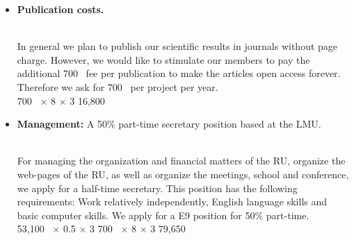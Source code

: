\documentclass[10pt,fleqn,twoside]{article}
\begin{document}
\begin{itemize}
For regular expenses of the management (printing costs, postal services, toner,
viewgraphs, copying materials, etc..) we request 1000~\EUR{} per year.
\vspace{0.2em}\\
1000~\EUR{} $\times$ 3              \hfill 3,000~\EUR{}\\
\item 
\begin{Emphasize}
{\bf Publication costs.}
\end{Emphasize}\\
In general we plan to publish our scientific results in journals without
page charge.  However, we would like to stimulate our members to pay 
the additional 700~\EUR{} fee per publication to make the articles 
open access forever. Therefore we ask for 700~\EUR{} per project per
year.
\vspace{0.2em}\\
700~\EUR{} $\times$ 8 $\times$ 3              \hfill 16,800~\EUR{}\\
\item 
\begin{Emphasize}
{\bf Management:} A 50\% part-time secretary position based at the LMU.
\end{Emphasize}\\
For managing the organization and financial matters of the RU, 
organize the web-pages of the RU, as
well as organize the meetings, school and conference, we apply for
a half-time secretary. This position has the following requirements:
Work relatively independently, English language skills and 
basic computer skills. We apply for a E9 position for 50\% part-time.
\vspace{0.2em}\\
53,100~\EUR{} $\times$ 0.5 $\times$ 3
700~\EUR{} $\times$ 8 $\times$ 3              \hfill 79,650~\EUR{}\\
\end{itemize}
 
\end{document}
